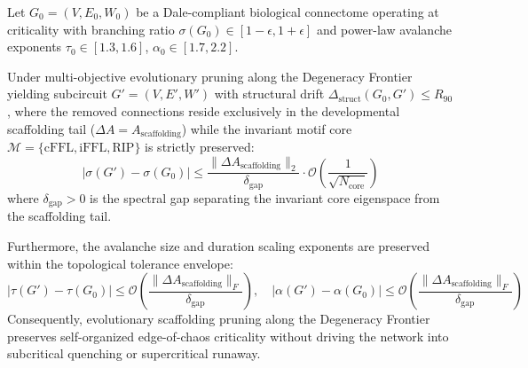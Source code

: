 \documentclass[11pt,letterpaper]{report}
\begin{document}
\begin{tcolorbox}[title=\textbf{Theorem 2 (Motif-Constrained Criticality Preservation Theorem)}]
Let $G_0 = (V, E_0, W_0)$ be a Dale-compliant biological connectome operating at criticality with branching ratio $\sigma(G_0) \in [1 - \epsilon, 1 + \epsilon]$ and power-law avalanche exponents $\tau_0 \in [1.3, 1.6]$, $\alpha_0 \in [1.7, 2.2]$. 

Under multi-objective evolutionary pruning along the Degeneracy Frontier yielding subcircuit $G' = (V, E', W')$ with structural drift $\Delta_{\mathrm{struct}}(G_0, G') \le R_{90}$, where the removed connections reside exclusively in the developmental scaffolding tail ($\Delta A = A_{\mathrm{scaffolding}}$) while the invariant motif core $\mathcal{M} = \{ \mathrm{cFFL}, \mathrm{iFFL}, \mathrm{RIP} \}$ is strictly preserved:
\begin{equation}
\left| \sigma(G') - \sigma(G_0) \right| \le \frac{\| \Delta A_{\mathrm{scaffolding}} \|_2}{\delta_{\mathrm{gap}}} \cdot \mathcal{O}\left( \frac{1}{\sqrt{N_{\mathrm{core}}}} \right)
\end{equation}
where $\delta_{\mathrm{gap}} > 0$ is the spectral gap separating the invariant core eigenspace from the scaffolding tail. 

Furthermore, the avalanche size and duration scaling exponents are preserved within the topological tolerance envelope:
\begin{equation}
\left| \tau(G') - \tau(G_0) \right| \le \mathcal{O}\left( \frac{\|\Delta A_{\mathrm{scaffolding}}\|_F}{\delta_{\mathrm{gap}}} \right), \quad \left| \alpha(G') - \alpha(G_0) \right| \le \mathcal{O}\left( \frac{\|\Delta A_{\mathrm{scaffolding}}\|_F}{\delta_{\mathrm{gap}}} \right)
\end{equation}
Consequently, evolutionary scaffolding pruning along the Degeneracy Frontier preserves self-organized edge-of-chaos criticality without driving the network into subcritical quenching or supercritical runaway.
\end{tcolorbox}
\end{document}
